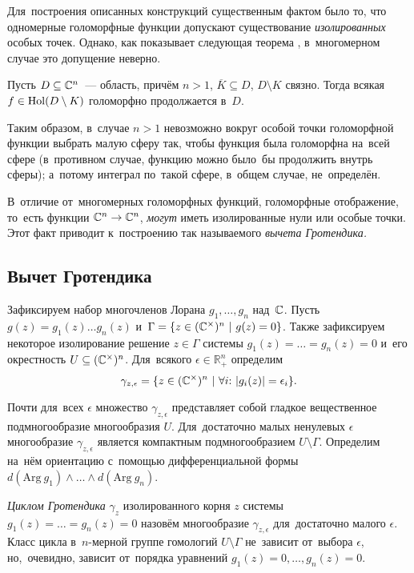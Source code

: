 \documentclass[a4paper,oneside]{article}
\begin{document}
Для~построения описанных конструкций существенным фактом было то, что одномерные голоморфные функции допускают
существование \textit{изолированных} особых точек. Однако, как показывает следующая теорема \cite{ShaII}, в~многомерном случае
это допущение неверно.

\begin{theorem*}
  Пусть $D \subseteq \mathbb{C}^n$~— область, причём $n > 1$, $\overline{K} \subseteq D$,
  $D \setminus K$ связно. Тогда всякая $f \in \mathrm{Hol}(D \setminus K)$
  голоморфно продолжается в~$D$.
\end{theorem*}

Таким образом, в~случае $n > 1$ невозможно вокруг особой точки голоморфной функции
выбрать малую сферу так, чтобы функция была голоморфна на~всей сфере (в~противном случае,
функцию можно было~бы продолжить внутрь сферы); а~потому интеграл по~такой сфере, в~общем случае, не~определён.

В~отличие от~многомерных голоморфных функций, голоморфные отображение, то~есть функции $\mathbb{C}^n \rightarrow \mathbb{C}^n$,
\textit{могут} иметь изолированные нули или особые точки. Этот факт приводит к~построению так называемого \textit{вычета Гротендика.}

\subsection{Вычет Гротендика}

Зафиксируем набор многочленов Лорана $g_1, \ldots, g_n$ над~$\mathbb{C}$.
Пусть $g(z) = g_1(z) \ldots g_n(z)$ и~$\Gamma = \{ z \in (\complex^\times)^n \ | \ g(z) = 0 \}$.
Также зафиксируем некоторое изолирование решение $z \in \Gamma$ системы $g_1(z) = \ldots = g_n(z) = 0$ и~его окрестность $U \subseteq (\mathbb{C}^\times)^n$.
Для~всякого $\epsilon \in \mathbb{R}_{+}^n$ определим
$$
    \gamma_{z, \epsilon} = \{ z \in (\mathbb{C}^\times)^n\ | \ \forall i{:}\ |g_i(z)| = \epsilon_i \}.
$$

Почти для~всех $\epsilon$ множество $\gamma_{z, \epsilon}$ представляет собой гладкое вещественное подмногообразие многообразия $U$.
Для~достаточно малых ненулевых $\epsilon$ многообразие $\gamma_{z, \epsilon}$ является компактным подмногообразием $U \setminus \Gamma$.
Определим на~нём ориентацию с~помощью дифференциальной формы $d(\mathrm{Arg}\ g_1) \wedge \ldots \wedge d(\mathrm{Arg}\ g_n)$.

\textit{Циклом Гротендика} $\gamma_z$ \cite{GelKho02} изолированного корня $z$ системы $g_1(z) = \ldots = g_n(z) = 0$ назовём многообразие $\gamma_{z, \epsilon}$ для~достаточно малого $\epsilon$.
Класс цикла в~$n$-мерной группе гомологий $U \setminus \Gamma$ не~зависит от~выбора $\epsilon$, но,~очевидно, зависит от~порядка уравнений $g_1(z) = 0, \ldots, g_n(z) = 0$.
\end{document}
